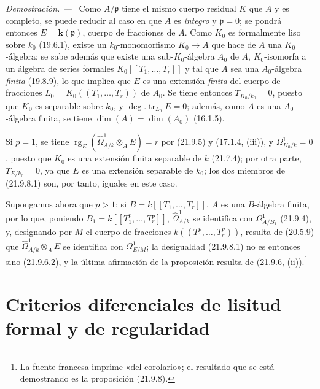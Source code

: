 \documentclass[10pt,oneside]{book}
\newenvironment{proof}{%
  \par\medskip\noindent\textit{Demostración. ---\ }}{\par}
\begin{document}
\begin{proof}
Como $A/\mathfrak p$ tiene el mismo cuerpo residual $K$ que $A$ y es completo,
se puede reducir al caso en que $A$ es \emph{íntegro} y $\mathfrak p=0$; se pondrá
entonces $E=\boldsymbol{k}(\mathfrak p)$, cuerpo de fracciones de $A$. Como $K_0$ es
formalmente liso sobre $k_0$ (19.6.1), existe un $k_0$-monomorfismo
$K_0\to A$ que hace de $A$ una $K_0$-álgebra; se sabe además que existe una
sub-$K_0$-álgebra $A_0$ de $A$, $K_0$-isomorfa a un álgebra de series formales
$K_0[[T_1,\ldots,T_r]]$ y tal que $A$ sea una $A_0$-álgebra \emph{finita}
(19.8.9), lo que implica que $E$ es una extensión \emph{finita} del cuerpo de
fracciones $L_0=K_0((T_1,\ldots,T_r))$ de $A_0$. Se tiene entonces
$\Upsilon_{K_0/k_0}=0$, puesto que $K_0$ es separable sobre $k_0$, y
$\deg.\operatorname{tr}_{L_0}E=0$; además, como $A$ es una $A_0$-álgebra
finita, se tiene $\dim(A)=\dim(A_0)$ (16.1.5).

Si $p=1$, se tiene
$\operatorname{rg}_E(\widehat\Omega^1_{A/k}\otimes_AE)=r$ por (21.9.5) y
(17.1.4, (iii)), y $\Omega^1_{K_0/k}=0$, puesto que $K_0$ es una extensión
finita separable de $k$ (21.7.4); por otra parte,
$\Upsilon_{E/k_0}=0$, ya que $E$ es una extensión separable de $k_0$; los dos
miembros de (21.9.8.1) son, por tanto, iguales en este caso.

Supongamos ahora que $p>1$; si $B=k[[T_1,\ldots,T_r]]$, $A$ es una
$B$-álgebra finita, por lo que, poniendo
$B_1=k[[T_1^p,\ldots,T_r^p]]$, $\widehat\Omega^1_{A/k}$ se identifica con
$\Omega^1_{A/B_1}$ (21.9.4), y, designando por $M$ el cuerpo de fracciones
$k((T_1^p,\ldots,T_r^p))$, resulta de (20.5.9) que
$\widehat\Omega^1_{A/k}\otimes_AE$ se identifica con $\Omega^1_{E/M}$; la
desigualdad (21.9.8.1) no es entonces sino (21.9.6.2), y la última afirmación
de la proposición resulta de (21.9.6, (ii)).\footnote{La fuente francesa
imprime «del corolario»; el resultado que se está demostrando es la
proposición (21.9.8).}
\end{proof}

\section{Criterios diferenciales de lisitud formal y de regularidad}
\label{section:0.22-es}
\end{document}
